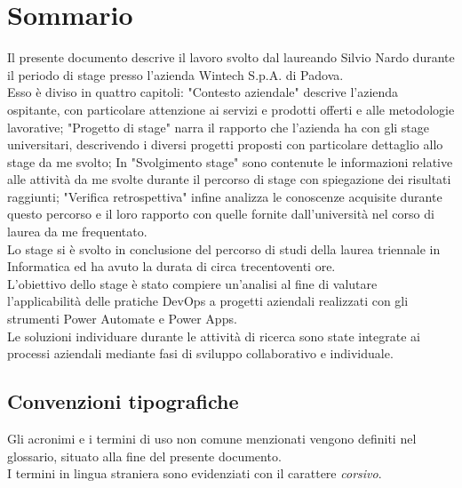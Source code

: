 \cleardoublepage
{}
{}
\begingroup
\let\clearpage\relax
\let\cleardoublepage\relax
\let\cleardoublepage\relax

\chapter*{Sommario}

Il presente documento descrive il lavoro svolto dal laureando Silvio Nardo durante il periodo di stage presso l'azienda Wintech S.p.A. di Padova.\\
Esso è diviso in quattro capitoli: "Contesto aziendale" descrive l'azienda ospitante, con particolare attenzione ai servizi e prodotti offerti e alle metodologie lavorative; "Progetto di stage" narra il rapporto che l'azienda ha con gli stage universitari, descrivendo i diversi progetti proposti con particolare dettaglio allo stage da me svolto; In "Svolgimento stage" sono contenute le informazioni relative alle attività da me svolte durante il percorso di stage con spiegazione dei risultati raggiunti; "Verifica retrospettiva" infine analizza le conoscenze acquisite durante questo percorso e il loro rapporto con quelle fornite dall'università nel corso di laurea da me frequentato.\\
Lo stage si è svolto in conclusione del percorso di studi della laurea triennale in Informatica ed ha avuto la durata di circa trecentoventi ore.\\
L'obiettivo dello stage è stato compiere un'analisi al fine di valutare l'applicabilità delle pratiche DevOps a progetti aziendali realizzati con gli strumenti Power Automate e Power Apps.\\
Le soluzioni individuare durante le attività di ricerca sono state integrate ai processi aziendali mediante fasi di sviluppo collaborativo e individuale.

\section*{Convenzioni tipografiche}
Gli acronimi e i termini di uso non comune menzionati vengono definiti nel glossario, situato alla fine del presente documento.\\
I termini in lingua straniera sono evidenziati con il carattere \emph{corsivo}.





\endgroup

\vfill

